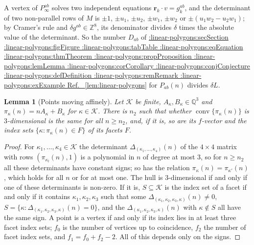 \documentclass[11pt,a4paper]{article}
\makeatletter
\def\Cref@getprefix#1:#2\relax{#1}
\def\Cref@prefix@sec{sec}
\def\Cref@prefix@fig{fig}
\def\Cref@prefix@tab{tab}
\def\Cref@prefix@eq{eq}
\def\Cref@prefix@thm{thm}
\def\Cref@prefix@prop{prop}
\def\Cref@prefix@lem{lem}
\def\Cref@prefix@cor{cor}
\def\Cref@prefix@conj{conj}
\def\Cref@prefix@def{def}
\def\Cref@prefix@rem{rem}
\def\Cref@prefix@ex{ex}
\def\Cref@type@cap#1{%
  \edef\Cref@tmp{#1}%
  \ifx\Cref@tmp\Cref@prefix@sec Section%
  \else\ifx\Cref@tmp\Cref@prefix@fig Figure%
  \else\ifx\Cref@tmp\Cref@prefix@tab Table%
  \else\ifx\Cref@tmp\Cref@prefix@eq Equation%
  \else\ifx\Cref@tmp\Cref@prefix@thm Theorem%
  \else\ifx\Cref@tmp\Cref@prefix@prop Proposition%
  \else\ifx\Cref@tmp\Cref@prefix@lem Lemma%
  \else\ifx\Cref@tmp\Cref@prefix@cor Corollary%
  \else\ifx\Cref@tmp\Cref@prefix@conj Conjecture%
  \else\ifx\Cref@tmp\Cref@prefix@def Definition%
  \else\ifx\Cref@tmp\Cref@prefix@rem Remark%
  \else\ifx\Cref@tmp\Cref@prefix@ex Example%
  \else Ref.%
  \fi\fi\fi\fi\fi\fi\fi\fi\fi\fi\fi\fi
}
\DeclareRobustCommand{\Cref}[1]{%
  \begingroup
  \edef\Cref@label{#1}%
  \edef\Cref@prefix{\expandafter\Cref@getprefix\Cref@label:\relax}%
  \hyperref[#1]{\Cref@type@cap{\Cref@prefix}~\ref*{#1}}%
  \endgroup
}
\theoremstyle{plain}
\newtheorem{lemma}[theorem]{Lemma}
\theoremstyle{definition}
\theoremstyle{remark}
\newcommand{\Z}{\mathbb{Z}}
\makeatother
\begin{document}
A vertex of $P_\infty^{ab}$ solves two independent equations $\mathbf r_k\cdot v=g^{ab}_k$, and the determinant of two non-parallel rows of $M$ is $\pm1$, $\pm u_1$, $\pm u_2$, $\pm w_1$, $\pm w_2$ or $\pm(u_1w_2-u_2w_1)$; by Cramer's rule and $\delta g^{ab}\in\Z^8$, its denominator divides $\delta$ times the absolute value of the determinant.
So the number $D_{ab}$ of \Cref{lem:linear-polygons} for $P_{ab}(n)$ divides $\delta L$.

\begin{lemma}[Points moving affinely]
\label{lem:moving-points}
Let $\mathcal K$ be finite, $A_\kappa,B_\kappa\in\mathbb Q^3$ and $\pi_\kappa(n)=nA_\kappa+B_\kappa$ for $\kappa\in\mathcal K$.
There is $n_2$ such that whether $\operatorname{conv}\{\pi_\kappa(n)\}$ is $3$-dimensional is the same for all $n\ge n_2$, and, if it is, so are its $f$-vector and the index sets $\{\kappa:\pi_\kappa(n)\in F\}$ of its facets $F$.
\end{lemma}

\begin{proof}
For $\kappa_1,\dots,\kappa_4\in\mathcal K$ the determinant $\Delta_{(\kappa_1,\dots,\kappa_4)}(n)$ of the $4\times4$ matrix with rows $(\pi_{\kappa_l}(n),1)$ is a polynomial in $n$ of degree at most $3$, so for $n\ge n_2$ all these determinants have constant signs; so has the relation $\pi_\kappa(n)=\pi_{\kappa'}(n)$, which holds for all $n$ or for at most one.
The hull is $3$-dimensional if and only if one of these determinants is non-zero.
If it is, $S\subseteq\mathcal K$ is the index set of a facet if and only if it contains $\kappa_1,\kappa_2,\kappa_3$ such that some $\Delta_{(\kappa_1,\kappa_2,\kappa_3,\kappa)}(n)\ne0$, $S=\{\kappa:\Delta_{(\kappa_1,\kappa_2,\kappa_3,\kappa)}(n)=0\}$, and the $\Delta_{(\kappa_1,\kappa_2,\kappa_3,\kappa)}(n)$ with $\kappa\notin S$ all have the same sign.
A point is a vertex if and only if its index lies in at least three facet index sets; $f_0$ is the number of vertices up to coincidence, $f_2$ the number of facet index sets, and $f_1=f_0+f_2-2$.
All of this depends only on the signs.
\end{proof}
\end{document}
